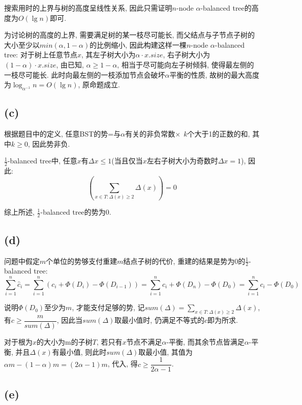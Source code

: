 \documentclass{article}
\begin{document}
搜索用时的上界与树的高度呈线性关系, 因此只需证明$n$-node $\alpha$-balanced tree的高度为$O(\lg n)$即可.

为讨论树的高度的上界, 需要满足树的某一枝尽可能长, 而父结点与子节点子树的大小至少以$min(\alpha, 1 - \alpha)$的比例缩小, 因此构建这样一棵$n$-node $\alpha$-balanced tree: 对于树上任意节点$x$, 其左子树大小为$\alpha \cdot x.size$, 右子树大小为$(1 - \alpha) \cdot x.size$, 由已知, $\alpha \ge 1 - \alpha$, 相当于尽可能向左子树倾斜, 使得最左侧的一枝尽可能长. 此时向最左侧的一枝添加节点会破坏$\alpha$平衡的性质, 故树的最大高度为$\log_{\alpha^{-1}} n = O(\lg n)$, 原命题成立.

\subsection{(c)}

根据题目中的定义, 任意BST的势=与$\alpha$有关的非负常数$\times \ \ k$个大于1的正数的和, 其中$k \ge 0$, 因此势非负.

$\frac{1}{2}$-balanced tree中, 任意$x$有$\Delta x \le 1$(当且仅当$x$左右子树大小为奇数时$\Delta x = 1$), 因此:
$$
\left(\sum_{x \in T: \Delta(x) \geq 2} \Delta(x)\right) = 0
$$

综上所述, $\frac{1}{2}$-balanced tree的势为0.

\subsection{(d)}

问题中假定$m$个单位的势够支付重建$m$结点子树的代价, 重建的结果是势为0的$\frac{1}{2}$-balanced tree:
$$
\sum_{i=1}^n \hat{c}_i=\sum_{i=1}^n\left(c_i+\Phi\left(D_i\right)-\Phi\left(D_{i-1}\right)\right)=\sum_{i=1}^n c_i+\Phi\left(D_n\right)-\Phi\left(D_0\right) = \sum_{i=1}^n c_i - \Phi\left(D_0\right) $$

说明$\Phi\left(D_0\right)$至少为$m$, 才能支付足够的势, 记$sum(\Delta) = \sum_{x \in T: \Delta(x) \geq 2} \Delta(x)$, 有$c \ge \dfrac{m}{sum(\Delta)}$, 因此当$sum(\Delta)$取最小值时, 仍满足不等式的$c$即为所求.

对于根为$x$的大小为m的子树$T$, 若只有$x$节点不满足$\alpha$-平衡, 而其余节点皆满足$\alpha$-平衡, 并且$\Delta(x)$有最小值, 则此时$sum(\Delta)$取最小值, 其值为$\alpha m - (1 - \alpha)m = (2\alpha - 1)m$, 代入, 得$c \ge \dfrac{1}{2\alpha - 1}$.

\subsection{(e)}
\end{document}
